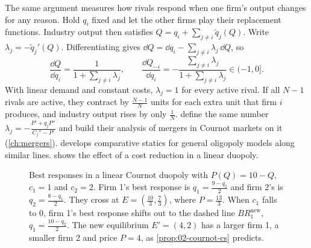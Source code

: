 The same argument measures how rivals respond when one firm's output changes for any reason. Hold $q_i$ fixed and
let the other firms play their replacement functions. Industry output then satisfies $Q = q_i + \sum_{j \ne i}
\tilde q_j(Q)$. Write $\lambda_j = -\tilde q_j'(Q)$. Differentiating gives $\dd Q = \dd q_i - \sum_{j \ne
i}\lambda_j\,\dd Q$, so
\begin{equation}\label{eq:02-rival-response}
  \frac{\dd Q}{\dd q_i} = \frac{1}{1 + \sum_{j \ne i}\lambda_j}, \qquad
  \frac{\dd Q_{-i}}{\dd q_i} = -\frac{\sum_{j \ne i}\lambda_j}{1 + \sum_{j \ne i}\lambda_j} \in (-1, 0] .
\end{equation}
With linear demand and constant costs, $\lambda_j = 1$ for every active rival. If all $N - 1$ rivals are active,
they contract by $\frac{N - 1}{N}$ units for each extra unit that firm $i$ produces, and industry output rises by
only $\frac{1}{N}$. \citet{FarrellShapiro1990} define the same number $\lambda_j = -\frac{P' + q_jP''}{C_j'' - P'}$
and build their analysis of mergers in Cournot markets on it (\cref{ch:mergers}).
\citet{Dixit1986} develops comparative statics for general oligopoly models along similar lines.
 shows the effect of a cost reduction in a linear duopoly.

\begin{figure}[htbp]
\centering
{}
\caption{Best responses in a linear Cournot duopoly with $P(Q) = 10 - Q$, $c_1 = 1$ and $c_2 = 2$. Firm 1's best
response is $q_1 = \frac{9 - q_2}{2}$ and firm 2's is $q_2 = \frac{8 - q_1}{2}$. They cross at
$E = \left(\frac{10}{3}, \frac{7}{3}\right)$, where $P = \frac{13}{3}$. When $c_1$ falls to 0, firm 1's best response
shifts out to the dashed line $BR_1^{\mathrm{new}}$, $q_1 = \frac{10 - q_2}{2}$. The new equilibrium $E' = (4, 2)$ has a larger firm 1, a
smaller firm 2 and price $P = 4$, as \cref{prop:02-cournot-cs} predicts.}
\label{fig:02-cournot-br}
\end{figure}

